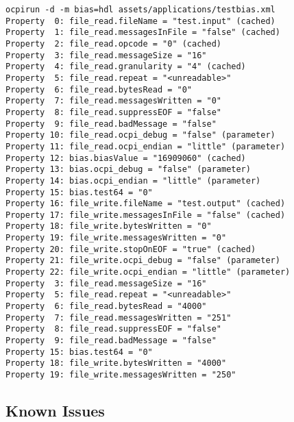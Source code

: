 \documentclass{article}
\begin{document}
\begin{lstlisting}
ocpirun -d -m bias=hdl assets/applications/testbias.xml
Property  0: file_read.fileName = "test.input" (cached)
Property  1: file_read.messagesInFile = "false" (cached)
Property  2: file_read.opcode = "0" (cached)
Property  3: file_read.messageSize = "16"
Property  4: file_read.granularity = "4" (cached)
Property  5: file_read.repeat = "<unreadable>"
Property  6: file_read.bytesRead = "0"
Property  7: file_read.messagesWritten = "0"
Property  8: file_read.suppressEOF = "false"
Property  9: file_read.badMessage = "false"
Property 10: file_read.ocpi_debug = "false" (parameter)
Property 11: file_read.ocpi_endian = "little" (parameter)
Property 12: bias.biasValue = "16909060" (cached)
Property 13: bias.ocpi_debug = "false" (parameter)
Property 14: bias.ocpi_endian = "little" (parameter)
Property 15: bias.test64 = "0"
Property 16: file_write.fileName = "test.output" (cached)
Property 17: file_write.messagesInFile = "false" (cached)
Property 18: file_write.bytesWritten = "0"
Property 19: file_write.messagesWritten = "0"
Property 20: file_write.stopOnEOF = "true" (cached)
Property 21: file_write.ocpi_debug = "false" (parameter)
Property 22: file_write.ocpi_endian = "little" (parameter)
Property  3: file_read.messageSize = "16"
Property  5: file_read.repeat = "<unreadable>"
Property  6: file_read.bytesRead = "4000"
Property  7: file_read.messagesWritten = "251"
Property  8: file_read.suppressEOF = "false"
Property  9: file_read.badMessage = "false"
Property 15: bias.test64 = "0"
Property 18: file_write.bytesWritten = "4000"
Property 19: file_write.messagesWritten = "250"
\end{lstlisting}

\subsection*{Known Issues}
\end{document}
